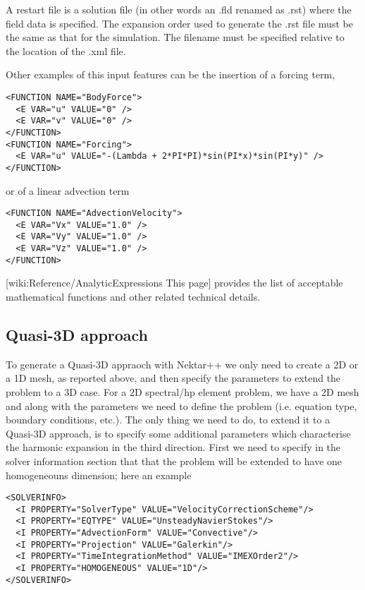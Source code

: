 A restart file is a solution file (in other words an .fld renamed as .rst) where
the field data is specified. The expansion order used to generate the .rst file
must be the same as that for the simulation. The filename must be specified
relative to the location of the .xml file.

Other examples of this input features can be the insertion of a forcing term,

\begin{lstlisting}[style=XMLStyle]
<FUNCTION NAME="BodyForce">
  <E VAR="u" VALUE="0" />
  <E VAR="v" VALUE="0" />
</FUNCTION>
<FUNCTION NAME="Forcing">
  <E VAR="u" VALUE="-(Lambda + 2*PI*PI)*sin(PI*x)*sin(PI*y)" />
</FUNCTION>
\end{lstlisting}

or of a linear advection term

\begin{lstlisting}[style=XMLStyle]
<FUNCTION NAME="AdvectionVelocity">
  <E VAR="Vx" VALUE="1.0" />
  <E VAR="Vy" VALUE="1.0" />
  <E VAR="Vz" VALUE="1.0" />
</FUNCTION>
\end{lstlisting}

[wiki:Reference/AnalyticExpressions This page] provides the list of acceptable mathematical functions and other related technical details.

\subsection{Quasi-3D approach}

To generate a Quasi-3D appraoch with Nektar++ we only need to create a 2D or a
1D mesh, as reported above, and then specify the parameters to extend the
problem to a 3D case. For a 2D spectral/hp element problem, we have a 2D mesh
and along with the parameters we need to define the problem (i.e. equation type,
boundary conditions, etc.). The only thing we need to do, to extend it to a
Quasi-3D approach, is to specify some additional parameters which characterise
the harmonic expansion in the third direction. First we need to specify in the
solver information section that that the problem will be extended to have one
homogeneouns dimension; here an example

\begin{lstlisting}[style=XMLStyle]
<SOLVERINFO>
  <I PROPERTY="SolverType" VALUE="VelocityCorrectionScheme"/>
  <I PROPERTY="EQTYPE" VALUE="UnsteadyNavierStokes"/>
  <I PROPERTY="AdvectionForm" VALUE="Convective"/>
  <I PROPERTY="Projection" VALUE="Galerkin"/>
  <I PROPERTY="TimeIntegrationMethod" VALUE="IMEXOrder2"/>
  <I PROPERTY="HOMOGENEOUS" VALUE="1D"/>
</SOLVERINFO>
\end{lstlisting}

